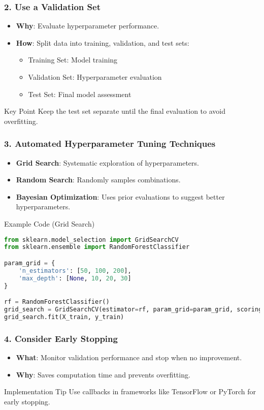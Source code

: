 \documentclass[aspectratio=169]{beamer}
\begin{document}
\begin{frame}[fragile]
    \frametitle{2. Use a Validation Set}
    \begin{itemize}
        \item \textbf{Why}: Evaluate hyperparameter performance.
        \item \textbf{How}: Split data into training, validation, and test sets:
        \begin{itemize}
            \item Training Set: Model training
            \item Validation Set: Hyperparameter evaluation
            \item Test Set: Final model assessment
        \end{itemize}
    \end{itemize}
    \begin{block}{Key Point}
        Keep the test set separate until the final evaluation to avoid overfitting.
    \end{block}
\end{frame}

\begin{frame}[fragile]
    \frametitle{3. Automated Hyperparameter Tuning Techniques}
    \begin{itemize}
        \item \textbf{Grid Search}: Systematic exploration of hyperparameters.
        \item \textbf{Random Search}: Randomly samples combinations.
        \item \textbf{Bayesian Optimization}: Uses prior evaluations to suggest better hyperparameters.
    \end{itemize}
    \begin{block}{Example Code (Grid Search)}
    \begin{lstlisting}[language=Python]
from sklearn.model_selection import GridSearchCV
from sklearn.ensemble import RandomForestClassifier

param_grid = {
    'n_estimators': [50, 100, 200],
    'max_depth': [None, 10, 20, 30]
}

rf = RandomForestClassifier()
grid_search = GridSearchCV(estimator=rf, param_grid=param_grid, scoring='accuracy', cv=5)
grid_search.fit(X_train, y_train)
    \end{lstlisting}
    \end{block}
\end{frame}

\begin{frame}
    \frametitle{4. Consider Early Stopping}
    \begin{itemize}
        \item \textbf{What}: Monitor validation performance and stop when no improvement.
        \item \textbf{Why}: Saves computation time and prevents overfitting.
    \end{itemize}
    \begin{block}{Implementation Tip}
        Use callbacks in frameworks like TensorFlow or PyTorch for early stopping.
    \end{block}
\end{frame}
\end{document}
